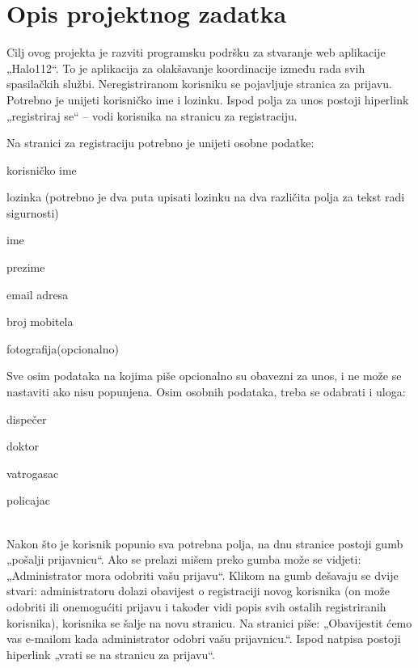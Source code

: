 \chapter{Opis projektnog zadatka}
		
		\text Cilj ovog projekta je razviti programsku podršku za stvaranje web aplikacije „Halo112“. To je aplikacija za olakšavanje koordinacije između rada svih spasilačkih službi. Neregistriranom korisniku se pojavljuje stranica za prijavu. Potrebno je unijeti korisničko ime i lozinku. Ispod polja za unos postoji hiperlink „registriraj se“ – vodi korisnika na stranicu za registraciju.
		 
		\text Na stranici za registraciju potrebno je unijeti osobne podatke:
		
		\begin{packed_item}
			\item \text korisničko ime
			\item \text lozinka (potrebno je dva puta upisati lozinku na dva različita polja za tekst radi sigurnosti)
			\item \text ime
			\item \text prezime 
			\item \text email adresa
			\item \text broj mobitela
			\item \text fotografija(opcionalno)
		\end{packed_item}
		\text Sve osim podataka na kojima piše opcionalno su obavezni za unos, i ne može se nastaviti ako nisu popunjena. Osim osobnih podataka, treba se odabrati i uloga:
		
		\begin{packed_item}
			\item \text dispečer 
			\item \text doktor
			\item \text vatrogasac
			\item \text policajac
		\end{packed_item}
		
		\textbf{}\\
		\text Nakon što je korisnik popunio sva potrebna polja, na dnu stranice postoji gumb „pošalji prijavnicu“. Ako se prelazi mišem preko gumba može se vidjeti: „Administrator mora odobriti vašu prijavu“. Klikom na gumb dešavaju se dvije stvari: administratoru dolazi obavijest o registraciji novog korisnika (on može odobriti ili onemogućiti prijavu i također vidi popis svih ostalih registriranih korisnika), korisnika se šalje na novu stranicu. Na stranici piše: „Obavijestit ćemo vas e-mailom kada administrator odobri vašu prijavnicu.“. Ispod natpisa postoji hiperlink „vrati se na stranicu za prijavu“.
		
